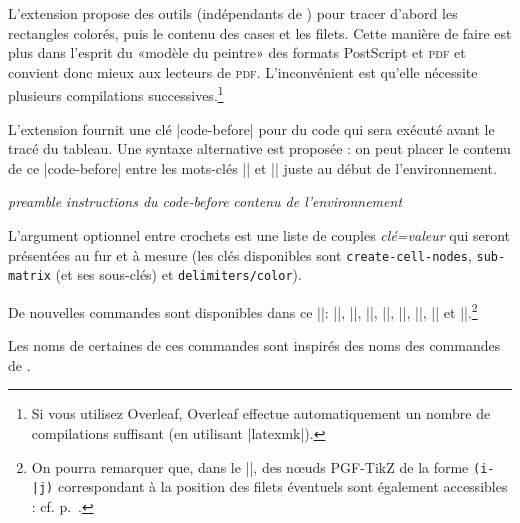\documentclass[dvipsnames]{article}%
\begin{document}
\label{color-in-code-before}

L'extension  propose des outils (indépendants de )
pour tracer d'abord les rectangles colorés, puis le contenu des cases et les
filets. Cette manière de faire est plus dans l'esprit du «modèle du peintre» des
formats PostScript et \textsc{pdf} et convient donc mieux aux lecteurs de
\textsc{pdf}. L'inconvénient est qu'elle nécessite plusieurs compilations
successives.\footnote{Si vous utilisez Overleaf, Overleaf effectue
  automatiquement un nombre de compilations suffisant (en utilisant |latexmk|).}

\medskip
L'extension  fournit une clé |code-before| pour du code qui sera
exécuté avant le tracé du tableau. Une syntaxe alternative est proposée : on
peut placer le contenu de ce |code-before| entre les mots-clés |\CodeBefore| et
|\Body| juste au début de l'environnement.

\smallskip
\begin{Code}
\begin{pNiceArray}{\textsl{preamble}}
\emph{}
  \textsl{instructions du code-before}
\emph{\Body}
  \textsl{contenu de l’environnement}
\end{pNiceArray}
\end{Code}

\smallskip
L'argument optionnel entre crochets est une liste de couples \textsl{clé=valeur}
qui seront présentées au fur et à mesure (les clés disponibles sont
  \texttt{create-cell-nodes}, \texttt{sub-matrix} (et ses sous-clés) et
  \texttt{delimiters/color}).

\smallskip
De nouvelles commandes sont disponibles dans ce |\CodeBefore|: |\cellcolor|,
|\rectanglecolor|, |\rowcolor|, |\columncolor|, |\rowcolors|, |\rowlistcolors|,
|\chessboardcolors| et |\arraycolor|.\footnote{On pourra remarquer que, dans le
  |\CodeBefore|, des nœuds PGF-TikZ de la forme \verb+(i-|j)+ correspondant à la
  position des filets éventuels sont également accessibles : cf.
  p.~\pageref{nodes-i}.}

Les noms de certaines de ces commandes sont inspirés des noms des commandes de
.
\end{document}
